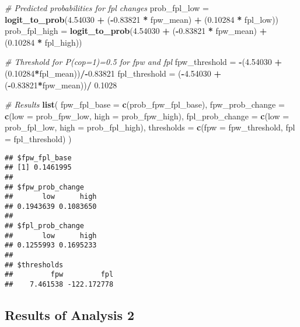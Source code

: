 \documentclass[
]{article}
\newenvironment{Shaded}{\begin{snugshade}}{\end{snugshade}}
\newcommand{\AttributeTok}[1]{\textcolor[rgb]{0.13,0.29,0.53}{#1}}
\newcommand{\CommentTok}[1]{\textcolor[rgb]{0.56,0.35,0.01}{\textit{#1}}}
\newcommand{\FloatTok}[1]{\textcolor[rgb]{0.00,0.00,0.81}{#1}}
\newcommand{\FunctionTok}[1]{\textcolor[rgb]{0.13,0.29,0.53}{\textbf{#1}}}
\newcommand{\NormalTok}[1]{#1}
\newcommand{\OtherTok}[1]{\textcolor[rgb]{0.56,0.35,0.01}{#1}}
\newcommand{\SpecialCharTok}[1]{\textcolor[rgb]{0.81,0.36,0.00}{\textbf{#1}}}
\begin{document}
\begin{Shaded}
\begin{Highlighting}[]
\CommentTok{\# Predicted probabilities for fpl changes}
\NormalTok{prob\_fpl\_low }\OtherTok{=} \FunctionTok{logit\_to\_prob}\NormalTok{(}\FloatTok{4.54030} \SpecialCharTok{+}\NormalTok{ (}\SpecialCharTok{{-}}\FloatTok{0.83821} \SpecialCharTok{*}\NormalTok{ fpw\_mean) }\SpecialCharTok{+}\NormalTok{ (}\FloatTok{0.10284} \SpecialCharTok{*}\NormalTok{ fpl\_low))}
\NormalTok{prob\_fpl\_high }\OtherTok{=} \FunctionTok{logit\_to\_prob}\NormalTok{(}\FloatTok{4.54030} \SpecialCharTok{+}\NormalTok{ (}\SpecialCharTok{{-}}\FloatTok{0.83821} \SpecialCharTok{*}\NormalTok{ fpw\_mean) }\SpecialCharTok{+}\NormalTok{ (}\FloatTok{0.10284} \SpecialCharTok{*}\NormalTok{ fpl\_high))}

\CommentTok{\# Threshold for P(cop=1)=0.5 for fpw and fpl}
\NormalTok{fpw\_threshold }\OtherTok{=} \SpecialCharTok{{-}}\NormalTok{(}\FloatTok{4.54030} \SpecialCharTok{+}\NormalTok{ (}\FloatTok{0.10284}\SpecialCharTok{*}\NormalTok{fpl\_mean))}\SpecialCharTok{/{-}}\FloatTok{0.83821}
\NormalTok{fpl\_threshold }\OtherTok{=}\NormalTok{ (}\SpecialCharTok{{-}}\FloatTok{4.54030} \SpecialCharTok{+}\NormalTok{ (}\SpecialCharTok{{-}}\FloatTok{0.83821}\SpecialCharTok{*}\NormalTok{fpw\_mean))}\SpecialCharTok{/} \FloatTok{0.1028}

\CommentTok{\# Results}
\FunctionTok{list}\NormalTok{(}
  \AttributeTok{fpw\_fpl\_base =} \FunctionTok{c}\NormalTok{(prob\_fpw\_fpl\_base),}
  \AttributeTok{fpw\_prob\_change =} \FunctionTok{c}\NormalTok{(}\AttributeTok{low =}\NormalTok{ prob\_fpw\_low, }\AttributeTok{high =}\NormalTok{ prob\_fpw\_high),}
  \AttributeTok{fpl\_prob\_change =} \FunctionTok{c}\NormalTok{(}\AttributeTok{low =}\NormalTok{ prob\_fpl\_low, }\AttributeTok{high =}\NormalTok{ prob\_fpl\_high),}
  \AttributeTok{thresholds =} \FunctionTok{c}\NormalTok{(}\AttributeTok{fpw =}\NormalTok{ fpw\_threshold, }\AttributeTok{fpl =}\NormalTok{ fpl\_threshold)}
\NormalTok{)}
\end{Highlighting}
\end{Shaded}

\begin{verbatim}
## $fpw_fpl_base
## [1] 0.1461995
## 
## $fpw_prob_change
##       low      high 
## 0.1943639 0.1083650 
## 
## $fpl_prob_change
##       low      high 
## 0.1255993 0.1695233 
## 
## $thresholds
##         fpw         fpl 
##    7.461538 -122.172778
\end{verbatim}

\hypertarget{results-of-analysis-2}{%
\subsection{Results of Analysis 2}\label{results-of-analysis-2}}
\end{document}
